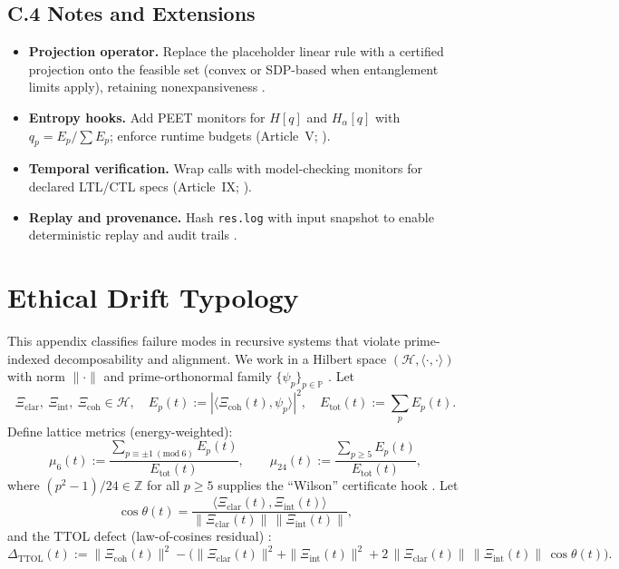 \documentclass[12pt]{amsart}
\theoremstyle{plain}
\begin{document}
\subsection*{C.4 Notes and Extensions}
\begin{itemize}
  \item \textbf{Projection operator.} Replace the placeholder linear rule with a certified projection onto the feasible set (convex or SDP-based when entanglement limits apply), retaining nonexpansiveness \cite{boyd2004convex}.
  \item \textbf{Entropy hooks.} Add PEET monitors for $H[q]$ and $H_\alpha[q]$ with $q_p=E_p/\sum E_p$; enforce runtime budgets (Article~V; \cite{cover2006elements}).
  \item \textbf{Temporal verification.} Wrap calls with model-checking monitors for declared LTL/CTL specs (Article~IX; \cite{clarke1999model,baier2008model}).
  \item \textbf{Replay and provenance.} Hash \texttt{res.log} with input snapshot to enable deterministic replay and audit trails \cite{schneider2000enforceable}.
\end{itemize}


\clearpage
\section{Ethical Drift Typology}

\noindent This appendix classifies failure modes in recursive systems that violate prime-indexed decomposability and alignment. We work in a Hilbert space $(\mathcal{H},\langle\cdot,\cdot\rangle)$ with norm $\|\cdot\|$ and prime-orthonormal family $\{\psi_p\}_{p\in\mathbb{P}}$ \cite{rudin1991functional,conway1990functional}. Let
\[
\Xi_{\mathrm{clar}},\ \Xi_{\mathrm{int}},\ \Xi_{\mathrm{coh}}\in\mathcal{H},\quad
E_p(t):=|\langle \Xi_{\mathrm{coh}}(t),\psi_p\rangle|^2,\quad
E_{\mathrm{tot}}(t):=\sum_{p}E_p(t).
\]
Define lattice metrics (energy-weighted):
\[
\mu_6(t):=\frac{\sum_{p\equiv \pm 1\ (\mathrm{mod}\ 6)}E_p(t)}{E_{\mathrm{tot}}(t)},\qquad
\mu_{24}(t):=\frac{\sum_{p\ge 5}E_p(t)}{E_{\mathrm{tot}}(t)},
\]
where $(p^2-1)/24\in\mathbb{Z}$ for all $p\ge5$ supplies the “Wilson” certificate hook \cite[Ch.~5]{hardy2008introduction}. Let
\[
\cos\theta(t)=\frac{\langle \Xi_{\mathrm{clar}}(t),\Xi_{\mathrm{int}}(t)\rangle}{\|\Xi_{\mathrm{clar}}(t)\|\,\|\Xi_{\mathrm{int}}(t)\|},
\]
and the TTOL defect (law-of-cosines residual) \cite{rudin1991functional,lax2002functional}:
\[
\Delta_{\mathrm{TTOL}}(t):=\|\Xi_{\mathrm{coh}}(t)\|^{2}-\Big(\|\Xi_{\mathrm{clar}}(t)\|^{2}+\|\Xi_{\mathrm{int}}(t)\|^{2}
+2\,\|\Xi_{\mathrm{clar}}(t)\|\,\|\Xi_{\mathrm{int}}(t)\|\,\cos\theta(t)\Big).
\]
\end{document}
